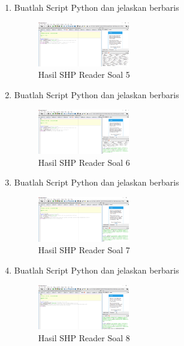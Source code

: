 \begin{enumerate}
    \item Buatlah Script Python dan jelaskan berbaris
    
    \hfill\break
    \begin{figure}[H]
		\includegraphics[width=4cm]{figures/1174008/3/soal5.PNG}
		\centering
		\caption{Hasil SHP Reader Soal 5}
    \end{figure}
  
    \item Buatlah Script Python dan jelaskan berbaris
    
    \hfill\break
    \begin{figure}[H]
		\includegraphics[width=4cm]{figures/1174008/3/soal6.PNG}
		\centering
		\caption{Hasil SHP Reader Soal 6}
    \end{figure}

    \item Buatlah Script Python dan jelaskan berbaris
    
    \hfill\break
    \begin{figure}[H]
		\includegraphics[width=4cm]{figures/1174008/3/soal7.PNG}
		\centering
		\caption{Hasil SHP Reader Soal 7}
    \end{figure}

    \item Buatlah Script Python dan jelaskan berbaris
    
    \hfill\break
    \begin{figure}[H]
		\includegraphics[width=4cm]{figures/1174008/3/soal8.PNG}
		\centering
		\caption{Hasil SHP Reader Soal 8}
    \end{figure}


\end{enumerate}
